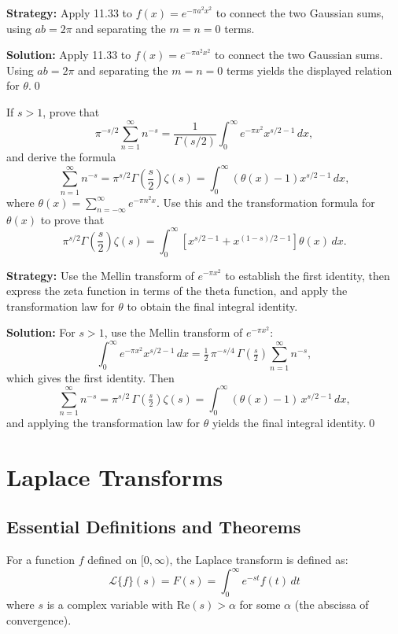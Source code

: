 \noindent\textbf{Strategy:} Apply 11.33 to $f(x)=e^{-\pi a^2 x^2}$ to connect the two Gaussian sums, using $ab=2\pi$ and separating the $m=n=0$ terms.

\bigskip\noindent\textbf{Solution:}
Apply 11.33 to $f(x)=e^{-\pi a^2 x^2}$ to connect the two Gaussian sums. Using $ab=2\pi$ and separating the $m=n=0$ terms yields the displayed relation for $\theta$.\qed


\begin{problembox}
\begin{problemstatement}
If $s > 1$, prove that
\[
\pi^{-s/2} \sum_{n=1}^\infty n^{-s} = \frac{1}{\Gamma(s/2)} \int_0^\infty e^{-\pi x^2} x^{s/2-1} \, dx,
\]
and derive the formula
\[
\sum_{n=1}^\infty n^{-s} = \pi^{s/2} \Gamma\left(\frac{s}{2}\right) \zeta(s) = \int_0^\infty \left( \theta(x) - 1 \right) x^{s/2-1} \, dx,
\]
where $\theta(x) = \sum_{n=-\infty}^\infty e^{-\pi n^2 x}$. Use this and the transformation formula for $\theta(x)$ to prove that
\[
\pi^{s/2} \Gamma\left(\frac{s}{2}\right) \zeta(s) = \int_0^\infty \left[ x^{s/2-1} + x^{(1-s)/2-1} \right] \theta(x) \, dx.
\]
\end{problemstatement}
\end{problembox}

\noindent\textbf{Strategy:} Use the Mellin transform of $e^{-\pi x^2}$ to establish the first identity, then express the zeta function in terms of the theta function, and apply the transformation law for $\theta$ to obtain the final integral identity.

\bigskip\noindent\textbf{Solution:}
For $s>1$, use the Mellin transform of $e^{-\pi x^2}$:
\[\int_0^{\infty} e^{-\pi x^2} x^{s/2-1}\,dx = \tfrac{1}{2}\,\pi^{-s/4}\,\Gamma\!\left(\tfrac{s}{2}\right)\sum_{n=1}^{\infty} n^{-s},\]
which gives the first identity. Then
\[\sum_{n=1}^{\infty} n^{-s}=\pi^{s/2}\,\Gamma\!\left(\tfrac{s}{2}\right)\zeta(s)=\int_0^{\infty} (\theta(x)-1)\,x^{s/2-1}\,dx,\]
and applying the transformation law for $\theta$ yields the final integral identity.\qed
\section{Laplace Transforms}

\subsection*{Essential Definitions and Theorems}

\begin{definition}
For a function $f$ defined on $[0, \infty)$, the Laplace transform is defined as:
\[\mathcal{L}\{f\}(s) = F(s) = \int_0^{\infty} e^{-st} f(t) \, dt\]
where $s$ is a complex variable with $\text{Re}(s) > \alpha$ for some $\alpha$ (the abscissa of convergence).
\end{definition}


